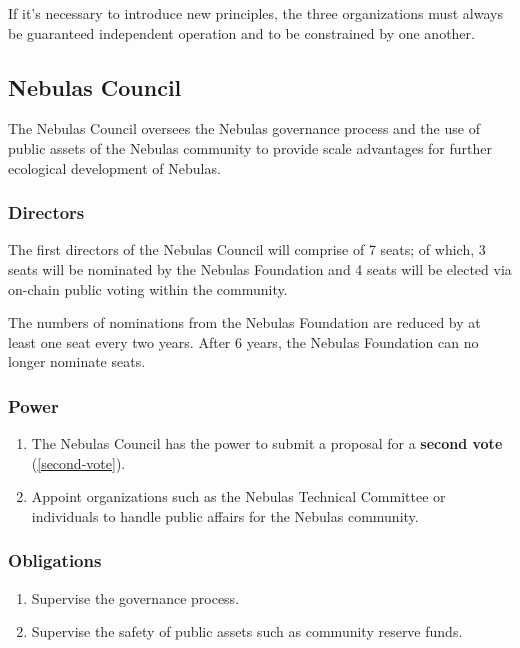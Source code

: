 If it's necessary to introduce new principles, the three organizations must always be guaranteed independent operation and to be constrained by one another.

\subsection{Nebulas Council}

The Nebulas Council oversees the Nebulas governance process and the use of public assets of the Nebulas community to provide scale advantages for further ecological development of Nebulas.

\subsubsection{Directors}

The first directors of the Nebulas Council will comprise of 7 seats; of which, 3 seats will be nominated by the Nebulas Foundation and 4 seats will be elected via on-chain public voting within the community.

The numbers of nominations from the Nebulas Foundation are reduced by at least one seat every two years. After 6 years, the Nebulas Foundation can no longer nominate seats.

\subsubsection{Power}

\begin{enumerate}
	\item The Nebulas Council has the power to submit a proposal for a \textbf{second vote} (\ref{second-vote}).
	\item Appoint organizations such as the Nebulas Technical Committee or individuals to handle public affairs for the Nebulas community.
\end{enumerate}

\subsubsection{Obligations}

\begin{enumerate}
	\item Supervise the governance process.
	\item Supervise the safety of public assets such as community reserve funds.
\end{enumerate}

